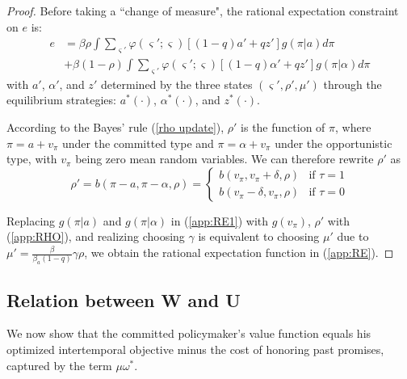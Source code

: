 \documentclass[12pt,letter,leqno]{article}
\theoremstyle{asn}
\theoremstyle{lem}
\theoremstyle{slem}
\theoremstyle{prop}
\theoremstyle{appprop}
\theoremstyle{rem}
\theoremstyle{defn}
\begin{document}
\begin{proof}
Before taking a ``change of measure", the rational expectation constraint on $e$ is:
\begin{align}
e &=\beta\rho\int \sum_{\varsigma'}\varphi (\varsigma';\varsigma)\left[ \left( 1-q\right) a'+qz' \right] g(\pi |a)d\pi \label{app:RE1} \\
&+\beta\left( 1-\rho \right) \int \sum_{\varsigma
'}\varphi (\varsigma';\varsigma)\left[ \left( 1-q\right)
\alpha'+qz' \right] g(\pi |\alpha
)d\pi \nonumber
\end{align}
with $a'$, $\alpha'$, and $z'$ determined by the three states $(\varsigma',\rho',\mu')$ through the equilibrium strategies:
$a^*(\cdot)$, $\alpha^*(\cdot)$, and $z^*(\cdot)$. 

According to the Bayes' rule (\ref{rho update}), $\rho'$ is the function of $\pi$, where $\pi =
a+v_\pi$ under the committed type and $\pi =
\alpha +v_\pi$ under the opportunistic type, with $v_\pi$ being zero mean random variables. We can therefore rewrite $\rho'$ as
\begin{equation}\label{app:RHO}
\rho' = b(\pi-a,\pi-\alpha,\rho) = \left\{
\begin{array}{ll}
b\left( v_\pi,v_\pi +\delta ,\rho \right) & \text{if } \tau=1 \\
b\left( v_\pi -\delta ,v_\pi ,\rho \right) & \text{if } \tau=0
\end{array}
\right.  
\end{equation}%

Replacing $g(\pi|a)$ and $g(\pi|\alpha)$ in (\ref{app:RE1}) with $g(v_\pi)$, $\rho'$ with (\ref{app:RHO}), and realizing choosing $\gamma$ is equivalent to choosing $\mu'$ due to $\mu'=\frac{\beta }{\beta_{a}(1-q)}\gamma\rho$, we obtain the rational expectation function in (\ref{app:RE}).
\end{proof}


\subsection{Relation between W and U}
We now show that the committed policymaker’s value function equals his optimized intertemporal objective minus the cost of honoring past promises, captured by the term $\mu \omega^*$.
\end{document}
